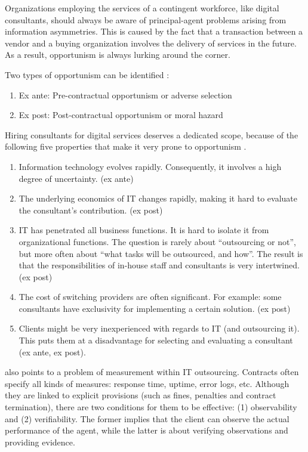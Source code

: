 \documentclass[12pt]{article}
\providecommand{\tightlist}{%
  \setlength{\itemsep}{0pt}\setlength{\parskip}{0pt}}
\begin{document}
Organizations employing the services of a contingent workforce, like
digital consultants, should always be aware of principal-agent problems
arising from information asymmetries. This is caused by the fact that a
transaction between a vendor and a buying organization involves the
delivery of services in the future. As a result, opportunism is always
lurking around the corner.

Two types of opportunism can be identified \citet[242]{clark1993}:

\begin{enumerate}
\def\labelenumi{\arabic{enumi}.}
\tightlist
\item
  Ex ante: Pre-contractual opportunism or adverse selection
\item
  Ex post: Post-contractual opportunism or moral hazard
\end{enumerate}

Hiring consultants for digital services deserves a dedicated scope,
because of the following five properties that make it very prone to
opportunism \citep[ 207]{leslie1995}.

\begin{enumerate}
\def\labelenumi{\arabic{enumi}.}
\tightlist
\item
  Information technology evolves rapidly. Consequently, it involves a
  high degree of uncertainty. (ex ante)
\item
  The underlying economics of IT changes rapidly, making it hard to
  evaluate the consultant's contribution. (ex post)
\item
  IT has penetrated all business functions. It is hard to isolate it
  from organizational functions. The question is rarely about
  ``outsourcing or not'', but more often about ``what tasks will be
  outsourced, and how''. The result is that the responsibilities of
  in-house staff and consultants is very intertwined. (ex post)
\item
  The cost of switching providers are often significant. For example:
  some consultants have exclusivity for implementing a certain solution.
  (ex post)
\item
  Clients might be very inexperienced with regards to IT (and
  outsourcing it). This puts them at a disadvantage for selecting and
  evaluating a consultant (ex ante, ex post).
\end{enumerate}

\citet[59]{aubert1996} also points to a problem of measurement within IT
outsourcing. Contracts often specify all kinds of measures: response
time, uptime, error logs, etc. Although they are linked to explicit
provisions (such as fines, penalties and contract termination), there
are two conditions for them to be effective: (1) observability and (2)
verifiability. The former implies that the client can observe the actual
performance of the agent, while the latter is about verifying
observations and providing evidence.
\end{document}
